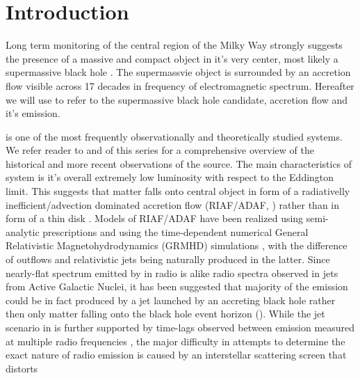 \section{Introduction}\label{sec:intro}


Long term monitoring of the central region of the Milky Way strongly suggests the presence of a massive and compact object in it's very center, most likely a supermassive black hole \citep{2019Sci...365..664D,2019A&A...625L..10G}. The supermassvie object is surrounded by an accretion flow visible across 17 decades in frequency of electromagnetic spectrum. Hereafter we will use \sgra to refer to the supermassive black hole candidate, accretion flow and it's emission.

\sgra is one of the most frequently observationally and theoretically studied systems.  We refer reader to  and  of this series for a comprehensive overview of the historical and more recent observations of the source. The main characteristics of \sgra system is it's overall extremely low luminosity with respect to the Eddington limit. This suggests that matter falls onto \sgra central object in form of a radiativelly inefficient/advection dominated accretion flow (RIAF/ADAF, \citealt{1977ApJ...214..840I,1994ApJ...428L..13N, 1995ApJ...444..231N,
  1995ApJ...452..710N, 1996A&AS..120C.287N, 1998ApJ...492..554N,2014ARA&A..52..529Y}) rather than in form of a thin disk \citep{1973A&A....24..337S}. Models of RIAF/ADAF have been realized using semi-analytic prescriptions \citep[e.g.,][]{1995Natur.374..623N,2000ApJ...541..234O, 2009ApJ...697...45B,2011ApJ...735..110B,2018ApJ...863..148P} and using the time-dependent numerical General Relativistic Magnetohydrodynamics (GRMHD) simulations \citep[e.g.,][]{2000ApJ...528..462H, 2003ApJ...589..458D,
  2003ApJ...589..444G, 2007CQGra..24S.235G, 2012ApJS..201....9F,
  2014ApJ...796...22F, 2016ApJS..225...22W, 2017ApJS..231...17A,
  2018JPhCS1031a2008O, 2019A&A...629A..61O, 2019ApJS..243...26P}, with the difference of outflows and
relativistic jets being naturally produced in the latter. Since nearly-flat spectrum emitted by \sgra in radio is alike radio spectra observed in jets from Active Galactic Nuclei, it has been suggested that majority of the \sgra emission could be in fact produced by a jet launched by an accreting black hole rather then only matter falling onto the black hole event horizon (\citealt{2000A&A...362..113F,2004A&A...414..895F, 2005ApJ...635.1203M, 2013A&A...559L...3M}).  While the jet scenario in \sgra is further supported by time-lags observed between emission measured at multiple radio frequencies \citep{2015A&A...576A..41B,2021arXiv210713402B}, the major difficulty in attempts to determine the exact nature of \sgra radio emission is caused by an interstellar scattering screen that distorts
